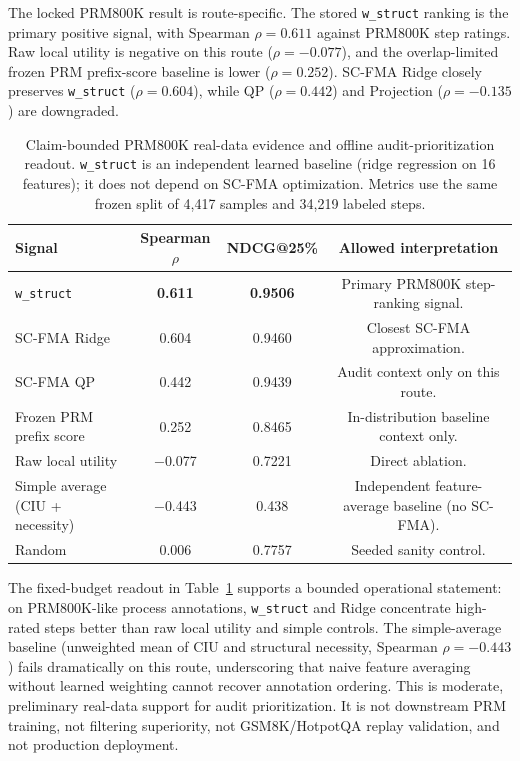 \documentclass[a4paper,fleqn]{cas-sc}
\begin{document}
The locked PRM800K result is route-specific. The stored \texttt{w\_struct} ranking is the primary positive signal, with Spearman $\rho=0.611$ against PRM800K step ratings. Raw local utility is negative on this route ($\rho=-0.077$), and the overlap-limited frozen PRM prefix-score baseline is lower ($\rho=0.252$). SC-FMA Ridge closely preserves \texttt{w\_struct} ($\rho=0.604$), while QP ($\rho=0.442$) and Projection ($\rho=-0.135$) are downgraded.

\begin{table}[ht]
\caption{Claim-bounded PRM800K real-data evidence and offline audit-prioritization readout. \texttt{w\_struct} is an independent learned baseline (ridge regression on 16 features); it does not depend on SC-FMA optimization. Metrics use the same frozen split of 4,417 samples and 34,219 labeled steps.}
\label{tab:prm800k-audit}
\centering
\small
\renewcommand{\arraystretch}{1.08}
\begin{tabular}{lccc}
\toprule
\textbf{Signal} & \textbf{Spearman $\rho$} & \textbf{NDCG@25\%} & \textbf{Allowed interpretation} \\
\midrule
\texttt{w\_struct} & \textbf{0.611} & \textbf{0.9506} & Primary PRM800K step-ranking signal. \\
SC-FMA Ridge & 0.604 & 0.9460 & Closest SC-FMA approximation. \\
SC-FMA QP & 0.442 & 0.9439 & Audit context only on this route. \\
Frozen PRM prefix score & 0.252 & 0.8465 & In-distribution baseline context only. \\
Raw local utility & $-$0.077 & 0.7221 & Direct ablation. \\
Simple average (CIU + necessity) & $-$0.443 & 0.438 & Independent feature-average baseline (no SC-FMA). \\
Random & 0.006 & 0.7757 & Seeded sanity control. \\
\bottomrule
\end{tabular}
\end{table}

The fixed-budget readout in Table~\ref{tab:prm800k-audit} supports a bounded operational statement: on PRM800K-like process annotations, \texttt{w\_struct} and Ridge concentrate high-rated steps better than raw local utility and simple controls. The simple-average baseline (unweighted mean of CIU and structural necessity, Spearman $\rho=-0.443$) fails dramatically on this route, underscoring that naive feature averaging without learned weighting cannot recover annotation ordering. This is moderate, preliminary real-data support for audit prioritization. It is not downstream PRM training, not filtering superiority, not GSM8K/HotpotQA replay validation, and not production deployment.
\end{document}
